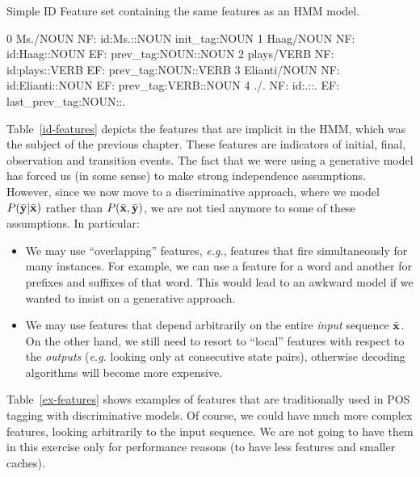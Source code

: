 \begin{example}
Simple ID Feature set containing the same features as an HMM model.
\begin{python}
0 Ms./NOUN NF: id:Ms.::NOUN init_tag:NOUN 
1 Haag/NOUN NF: id:Haag::NOUN EF: prev_tag:NOUN::NOUN 
2 plays/VERB NF: id:plays::VERB EF: prev_tag:NOUN::VERB 
3 Elianti/NOUN NF: id:Elianti::NOUN EF: prev_tag:VERB::NOUN 
4 ./. NF: id:.::. EF: last_prev_tag:NOUN::. 
\end{python}
\end{example}

Table~\ref{id-features} depicts the features that are implicit in the HMM, which was the subject of 
the previous chapter. These features are indicators of initial, final, observation and transition events. 
The fact that we were using a generative model has forced us (in some sense) to 
make strong independence assumptions. 
However, since we now move to a discriminative approach, where we model $P(\bar{\mathbf{y}}|\bar{\mathbf{x}})$ rather than $P(\bar{\mathbf{x}},\bar{\mathbf{y}})$, we are not tied anymore to 
some of these assumptions. In particular: 
\begin{itemize}
\item We may use ``overlapping'' features, \emph{e.g.}, features that fire simultaneously for many instances. 
For example, we can use a feature for a word and another for prefixes and suffixes of that word. 
This would lead to an awkward model if we wanted to insist on a generative approach. 
\item We may use features that depend arbitrarily on the entire \emph{input} sequence $\bar{\mathbf{x}}$. On the other hand, 
we still need to resort to ``local'' features with respect to the \emph{outputs} (\emph{e.g.} looking only at consecutive state pairs), 
otherwise decoding algorithms will become more expensive.  
\end{itemize}
Table~\ref{ex-features} shows examples of features that are traditionally used in POS tagging with discriminative models.  
Of course, we could have much more complex features, looking arbitrarily to 
the input sequence. We are not going to have them in this
exercise only for performance reasons (to have less features and smaller caches).

